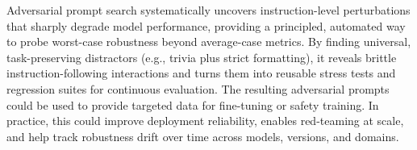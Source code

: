 \documentclass{article} %
\begin{document}
Adversarial prompt search systematically uncovers instruction-level perturbations that sharply degrade model performance, providing a principled, automated way to probe worst-case robustness beyond average-case metrics. By finding universal, task-preserving distractors (e.g., trivia plus strict formatting), it reveals brittle instruction-following interactions and turns them into reusable stress tests and regression suites for continuous evaluation. The resulting adversarial prompts could be used to provide targeted data for fine-tuning or safety training. In practice, this could improve deployment reliability, enables red-teaming at scale, and help track robustness drift over time across models, versions, and domains.


\end{document}
